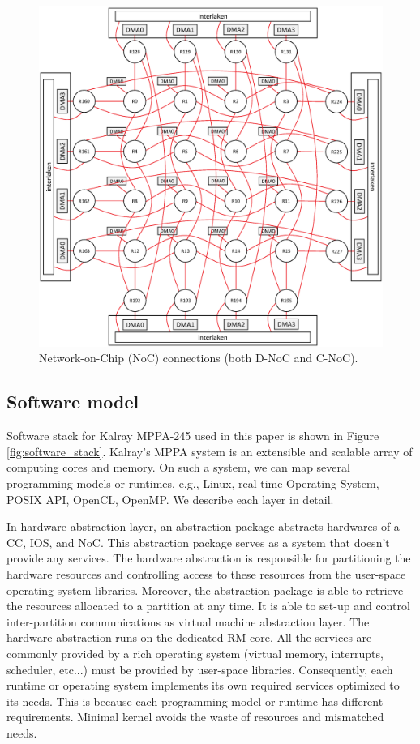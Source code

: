 \documentclass{sig-alternate-05-2015}
\begin{document}
\begin{figure}[t]
  \centering
  \includegraphics[width=1.0\linewidth]{../figure/noc_map.eps}
  \caption{\label{fig:noc_map}
    Network-on-Chip (NoC) connections (both D-NoC and C-NoC).}
\end{figure}

\subsection{Software model}
\label{sec:software_model}
Software stack for Kalray MPPA-245 used in this paper is shown in Figure \ref{fig:software_stack}.
Kalray's MPPA system is an extensible and scalable array of computing cores and memory.
On such a system, we can map several programming models or runtimes, e.g., Linux, real-time Operating System, POSIX API, OpenCL, OpenMP.
We describe each layer in detail.

In hardware abstraction layer, an abstraction package abstracts hardwares of a CC, IOS, and NoC.
This abstraction package serves as a system that doesn't provide any services.
The hardware abstraction is responsible for partitioning the hardware resources and controlling access to these resources from the user-space operating system libraries.
Moreover, the abstraction package is able to retrieve the resources allocated to a partition at any time.
It is able to set-up and control inter-partition communications as virtual machine abstraction layer.
The hardware abstraction runs on the dedicated RM core.
All the services are commonly provided by a rich operating system (virtual memory, interrupts, scheduler, etc...) must be provided by user-space libraries.
Consequently, each runtime or operating system implements its own required services optimized to its needs.
This is because each programming model or runtime has different requirements.
Minimal kernel avoids the waste of resources and mismatched needs.
\end{document}
